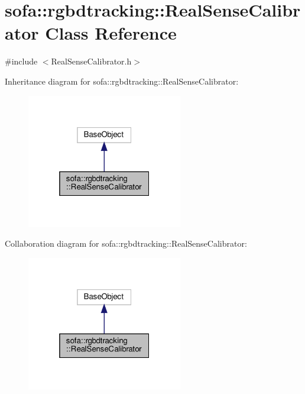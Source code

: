 \hypertarget{classsofa_1_1rgbdtracking_1_1_real_sense_calibrator}{}\section{sofa\+:\+:rgbdtracking\+:\+:Real\+Sense\+Calibrator Class Reference}
\label{classsofa_1_1rgbdtracking_1_1_real_sense_calibrator}


{\ttfamily \#include $<$Real\+Sense\+Calibrator.\+h$>$}



Inheritance diagram for sofa\+:\+:rgbdtracking\+:\+:Real\+Sense\+Calibrator\+:\nopagebreak
\begin{figure}[H]
\begin{center}
\leavevmode
\includegraphics[width=193pt]{classsofa_1_1rgbdtracking_1_1_real_sense_calibrator__inherit__graph}
\end{center}
\end{figure}


Collaboration diagram for sofa\+:\+:rgbdtracking\+:\+:Real\+Sense\+Calibrator\+:\nopagebreak
\begin{figure}[H]
\begin{center}
\leavevmode
\includegraphics[width=193pt]{classsofa_1_1rgbdtracking_1_1_real_sense_calibrator__coll__graph}
\end{center}
\end{figure}
